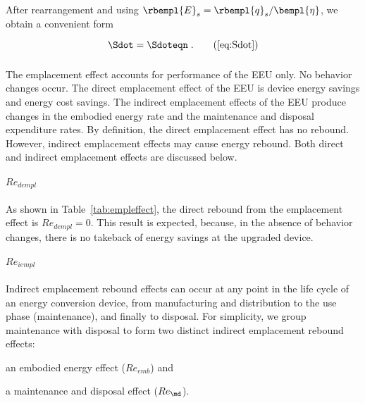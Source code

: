 After rearrangement and using $\rbempl{E}_s = \rbempl{q}_s/\bempl{\eta}$, 
we obtain a convenient form

\begin{equation}
  \Sdot = \Sdoteqn \; .  \tag{\ref{eq:Sdot}}
\end{equation}


\subsubsection{\Empleffect{}}
\label{sec:Re_emp}

The emplacement effect accounts for performance of the EEU only.
No behavior changes occur.
The direct emplacement effect of the EEU is device energy savings and energy cost savings.
The indirect emplacement effects of the EEU produce changes in the embodied energy rate and
the maintenance and disposal expenditure rates.
By definition, the direct emplacement effect has no rebound. 
However, indirect emplacement effects may cause energy rebound.
Both direct and indirect emplacement effects are discussed below.


\paragraph{$Re_{dempl}$}
\label{sec:Re_dempl}

As shown in Table~\ref{tab:empleffect},
the direct rebound from the emplacement effect is
$Re_{dempl} = 0$.
This result is expected, 
because, in the absence of behavior changes,
there is no takeback of energy savings
at the upgraded device.


\paragraph{$Re_{iempl}$} 
\label{sec:Re_iempl}

Indirect emplacement rebound effects 
can occur at any point in the life cycle of an energy conversion device,
from manufacturing and distribution 
to the use phase (maintenance),
and finally to disposal.
For simplicity, we group maintenance with disposal to form
two distinct indirect emplacement rebound effects:
%
\begin{enumerate*}[label={(\roman*)}]
	
  \item an embodied energy effect ($Re_{emb}$) and 
  
  \item a maintenance and disposal effect ($Re_{\md}$).
    
\end{enumerate*}


